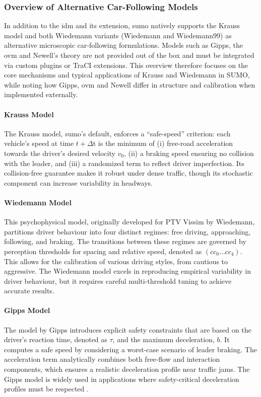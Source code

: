 \subsubsection{Overview of Alternative Car-Following Models}
\label{subsubsec:alternative_models}
In addition to the \ac{idm} and its extension, \ac{sumo} natively supports the Krauss model and both Wiedemann variants (Wiedemann and Wiedemann99) as alternative microscopic car‐following formulations. Models such as Gipps, the \acf{ovm} and Newell’s theory are not provided out of the box and must be integrated via custom plugins or TraCI extensions. This overview therefore focuses on the core mechanisms and typical applications of Krauss and Wiedemann in SUMO, while noting how Gipps, \ac{ovm} and Newell differ in structure and calibration when implemented externally.

\paragraph{Krauss Model}  
The Krauss model, \ac{sumo}’s default, enforces a \enquote{safe-speed} criterion: each vehicle’s speed at time $t+\Delta $t is the minimum of (i) free-road acceleration towards the driver’s desired velocity $v_0$, (ii) a braking speed ensuring no collision with the leader, and (iii) a randomized term to reflect driver imperfection. Its collision-free guarantee makes it robust under dense traffic, though its stochastic component can increase variability in headways. \cite{Krauss1997}

\paragraph{Wiedemann Model}
This psychophysical model, originally developed for PTV Vissim by Wiedemann, partitions driver behaviour into four distinct regimes: free driving, approaching, following, and braking. The transitions between these regimes are governed by perception thresholds for spacing and relative speed, denoted as $(cc_0\ldots cc_4)$. This allows for the calibration of various driving styles, from cautious to aggressive. The Wiedemann model excels in reproducing empirical variability in driver behaviour, but it requires careful multi-threshold tuning to achieve accurate results. \cite{Wiedemann1974}

\paragraph{Gipps Model}
The model by Gipps introduces explicit safety constraints that are based on the driver's reaction time, denoted as $\tau$, and the maximum deceleration, $b$. It computes a safe speed by considering a worst-case scenario of leader braking. The acceleration term analytically combines both free-flow and interaction components, which ensures a realistic deceleration profile near traffic jams. The Gipps model is widely used in applications where safety-critical deceleration profiles must be respected \cite{Gipps1981}.

